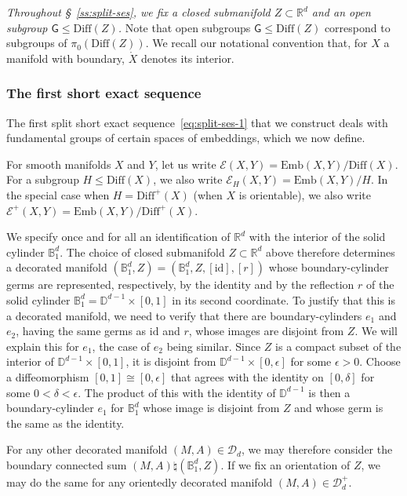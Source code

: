 \documentclass[AHL,Unicode,published]{cedram}
\newcommand{\Emb}{\mathrm{Emb}}
\newcommand{\Diff}{\mathrm{Diff}}
\newcommand{\id}{\mathrm{id}}
\newcommand{\Int}{\mathring}
\newcommand{\sG}{\mathsf{G}}
\newcommand{\cD}{\mathcal{D}}
\newcommand{\cE}{\mathcal{E}}
\newcommand{\bB}{\mathbb{B}}
\newcommand{\bD}{\mathbb{D}}
\newcommand{\bR}{\mathbb{R}}
\renewcommand{\leq}{\leqslant}
\begin{document}
\emph{Throughout \S~\ref{ss:split-ses}, we fix a closed submanifold $Z \subset \bR^d$ and an open subgroup $\sG \leq \Diff(Z)$.} Note that open subgroups $\sG \leq \Diff(Z)$ correspond to subgroups of $\pi_{0}(\Diff(Z))$. We recall our notational convention that, for $X$ a manifold with boundary, $\Int{X}$ denotes its interior.


\subsubsection{The first short exact sequence}\label{sss:split-ses-1}

The first split short exact sequence~\eqref{eq:split-ses-1} that we construct deals with fundamental groups of certain spaces of embeddings, which we now define.

\begin{defi}\label{def:cE}
For smooth manifolds $X$ and $Y$, let us write $\cE(X,Y) = \Emb(X,Y) / \Diff(X)$. For a subgroup $H \leq \Diff(X)$, we also write $\cE_{H}(X,Y) = \Emb(X,Y)/H$. In the special case when $H = \Diff^{+}(X)$ (when $X$ is orientable), we also write $\cE^{+}(X,Y) = \Emb(X,Y)/\Diff^{+}(X)$.
\end{defi}

We specify once and for all an identification of $\bR^d$ with the interior of the solid cylinder $\bB^d_{1}$. The choice of closed submanifold $Z \subset \bR^d$ above therefore determines a decorated manifold $(\bB^d_{1},Z) = (\bB^d_{1},Z,[\id],[r])$ whose boundary-cylinder germs are represented, respectively, by the identity and by the reflection $r$ of the solid cylinder $\bB^d_{1} = \bD^{d-1} \times [0,1]$ in its second coordinate. To justify that this is a decorated manifold, we need to verify that there are boundary-cylinders $e_1$ and $e_2$, having the same germs as $\id$ and $r$, whose images are disjoint from $Z$. We will explain this for $e_1$, the case of $e_2$ being similar. Since $Z$ is a compact subset of the interior of $\bD^{d-1} \times [0,1]$, it is disjoint from $\bD^{d-1} \times [0,\epsilon]$ for some $\epsilon > 0$. Choose a diffeomorphism $[0,1] \cong [0,\epsilon]$ that agrees with the identity on $[0,\delta]$ for some $0 < \delta < \epsilon$. The product of this with the identity of $\bD^{d-1}$ is then a boundary-cylinder $e_1$ for $\bB^d_{1}$ whose image is disjoint from $Z$ and whose germ is the same as the identity.

For any other decorated manifold $(M,A) \in \cD_{d}$, we may therefore consider the boundary connected sum $(M,A) \natural (\bB^d_{1},Z)$. If we fix an orientation of $Z$, we may do the same for any orientedly decorated manifold $(M,A) \in \cD_{d}^{+}$.
\end{document}
